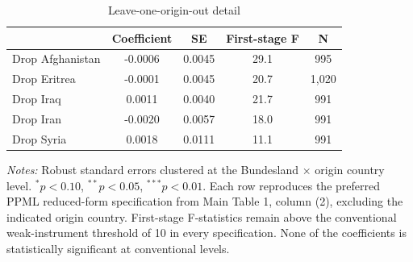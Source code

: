 \begin{table}[!htbp]
\centering
\caption{Leave-one-origin-out detail}
\label{tab:appendix_leave_one_origin_out}
\small
\begin{tabular}{lcccc}
\toprule
 & Coefficient & SE & First-stage F & N \\
\midrule
Drop Afghanistan & -0.0006 & 0.0045 & 29.1 & 995 \\
Drop Eritrea & -0.0001 & 0.0045 & 20.7 & 1,020 \\
Drop Iraq & 0.0011 & 0.0040 & 21.7 & 991 \\
Drop Iran & -0.0020 & 0.0057 & 18.0 & 991 \\
Drop Syria & 0.0018 & 0.0111 & 11.1 & 991 \\
\bottomrule
\end{tabular}
\begin{minipage}{0.85\textwidth}
\vspace{0.2cm}
\footnotesize
\textit{Notes:} Robust standard errors clustered at the Bundesland $\times$ origin country level. $^{*}p<0.10$, $^{**}p<0.05$, $^{***}p<0.01$. Each row reproduces the preferred PPML reduced-form specification from Main Table 1, column (2), excluding the indicated origin country. First-stage F-statistics remain above the conventional weak-instrument threshold of 10 in every specification. None of the coefficients is statistically significant at conventional levels.
\end{minipage}
\end{table}
